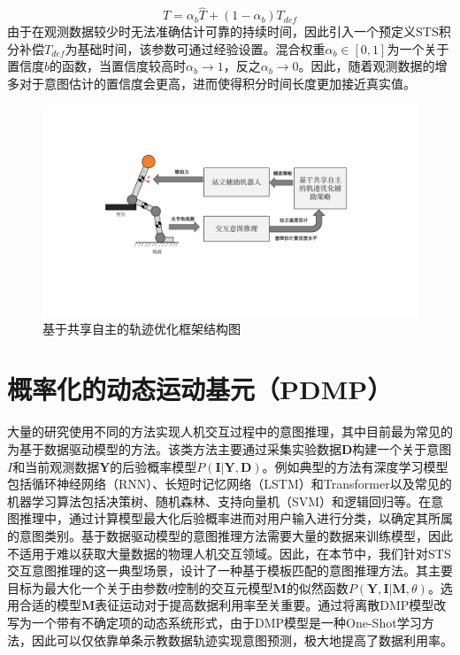 \begin{equation}
    T=\alpha_b \hat T + (1-\alpha_b)T_{def}
    \label{eq:4-3}
\end{equation}
由于在观测数据较少时无法准确估计可靠的持续时间，因此引入一个预定义STS积分补偿$T_{def}$为基础时间，该参数可通过经验设置。混合权重$\alpha_b \in [0,1]$为一个关于置信度$b$的函数，当置信度较高时$\alpha_b \rightarrow 1$，反之$\alpha_b \rightarrow 0$。因此，随着观测数据的增多对于意图估计的置信度会更高，进而使得积分时间长度更加接近真实值。

\begin{figure}[!t]
    \centering\includegraphics[width=1\textwidth]{figures/4-Fig-2.pdf}
    \caption{基于共享自主的轨迹优化框架结构图}
    \label{fig:4-2}
\end{figure}

\section{概率化的动态运动基元（PDMP）} 
大量的研究使用不同的方法实现人机交互过程中的意图推理，其中目前最为常见的为基于数据驱动模型的方法。该类方法主要通过采集实验数据$\mathbf{D}$构建一个关于意图$I$和当前观测数据$\mathbf{Y}$的后验概率模型$P(\mathbf{I}|\mathbf{Y},\mathbf{D})$。例如典型的方法有深度学习模型包括循环神经网络（RNN）、长短时记忆网络（LSTM）和Transformer以及常见的机器学习算法包括决策树、随机森林、支持向量机（SVM）和逻辑回归等。在意图推理中，通过计算模型最大化后验概率进而对用户输入进行分类，以确定其所属的意图类别。基于数据驱动模型的意图推理方法需要大量的数据来训练模型，因此不适用于难以获取大量数据的物理人机交互领域。因此，在本节中，我们针对STS交互意图推理的这一典型场景，设计了一种基于模板匹配的意图推理方法。其主要目标为最大化一个关于由参数$\theta$控制的交互元模型$\mathbf{M}$的似然函数$P(\mathbf{Y},\mathbf{I}|\mathbf{M},\theta)$。选用合适的模型$\mathbf{M}$表征运动对于提高数据利用率至关重要。通过将离散DMP模型改写为一个带有不确定项的动态系统形式，由于DMP模型是一种One-Shot学习方法，因此可以仅依靠单条示教数据轨迹实现意图预测，极大地提高了数据利用率。

